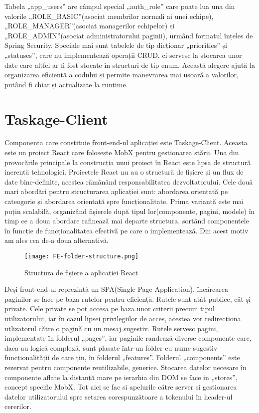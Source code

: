 Tabela „app_users” are câmpul special „auth_role” care poate lua una din valorile „ROLE_BASIC”(asociat membrilor normali ai unei echipe), „ROLE_MANAGER”(asociat managerilor echipelor) și „ROLE_ADMIN”(asociat administratorului paginii), urmând formatul înțeles de Spring Security. Speciale mai sunt tabelele de tip dicționar „priorities” și „statuses”, care nu implementează operații CRUD, ci servesc la stocarea unor date care altfel ar fi fost stocate în structuri de tip enum. Această alegere ajută la organizarea eficientă a codului și permite manevrarea mai ușoară a valorilor, putând fi chiar și actualizate la runtime.

\section{Taskage-Client}

Componenta care constituie front-end-ul aplicației este Taskage-Client. Aceasta este un proiect React care folosește MobX pentru gestionarea stării. Una din provocările principale la construcția unui proiect în React este lipsa de structură inerentă tehnologiei. Proiectele React nu au o structură de fișiere și un flux de date bine-definite, acestea rămânând responsabilitatea dezvoltatorului. Cele două mari abordări pentru structurarea aplicației sunt: abordarea orientată pe cateogorie și abordarea orientată spre funcționalitate. Prima variantă este mai puțin scalabilă, organizând fișierele după tipul lor(componente, pagini, modele) în timp ce a doua abordare rafinează mai departe structura, sortând componentele în funcție de funcționalitatea efectivă pe care o implementează. Din acest motiv am ales cea de-a doua alternativă.

 \begin{figure}[ht]
	\centering
 	 \texttt{[image: FE-folder-structure.png]}
	\caption{Structura de fișiere a aplicației React}
	\label{FE-folder-structure}
 \end{figure}

Deși front-end-ul reprezintă un SPA(Single Page Application), încărcarea paginilor se face pe baza rutelor pentru eficiență. Rutele sunt atât publice, cât și private. Cele private se pot accesa pe baza unor criterii precum tipul utilizatorului, iar în cazul lipsei privilegiilor de acces, acestea vor redirecționa utlizatorul către o pagină cu un mesaj sugestiv. Rutele servesc pagini, implementate în folderul „pages”, iar paginile randează diverse componente care, daca au logică complexă, sunt plasate într-un folder cu nume sugestiv funcționalității de care țin, în folderul „features”. Folderul „components” este rezervat pentru componente reutilizabile, generice. Stocarea datelor necesare în componente aflate la distanță mare pe ierarhia din DOM se face in „stores”, concept specific MobX. Tot aici se fac si apelurile către server și gestionarea datelor utilizatorului spre setarea corespunzătoare a tokenului în header-ul cererilor.

